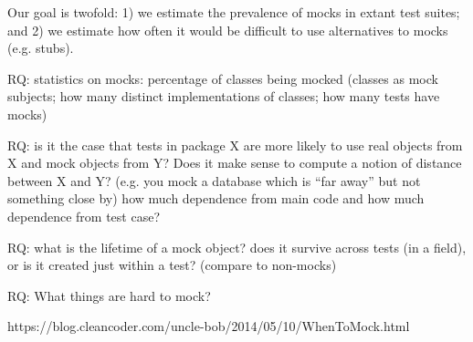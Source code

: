 Our goal is twofold: 1) we estimate the prevalence of mocks in extant test suites; and 2) we estimate how often it would be difficult to use alternatives to mocks (e.g. stubs).

RQ: statistics on mocks: percentage of classes being mocked (classes as mock subjects; how many distinct implementations of classes; how many tests have mocks)

RQ: is it the case that tests in package X are more likely to use real objects from X and mock objects from Y? Does it make sense to compute a notion of distance between X and Y? (e.g. you mock a database which is “far away” but not something close by)
how much dependence from main code and how much dependence from test case?

RQ: what is the lifetime of a mock object? does it survive across tests (in a field), or is it created just within a test? (compare to non-mocks)

RQ: What things are hard to mock?

https://blog.cleancoder.com/uncle-bob/2014/05/10/WhenToMock.html


